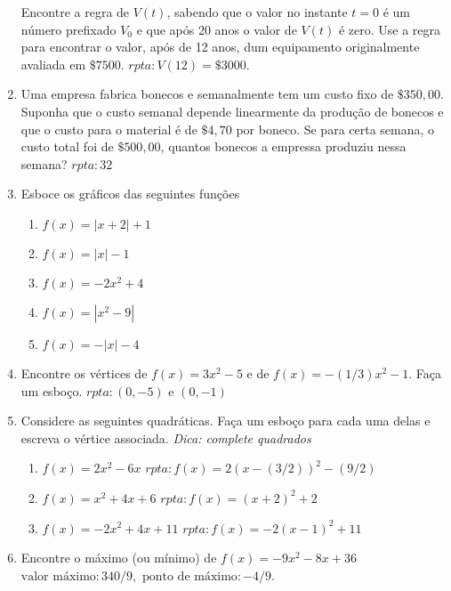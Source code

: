 \documentclass[11pt]{article}
\begin{document}
\begin{enumerate}
      Encontre a regra de $V(t)$, sabendo que o valor no instante $t=0$ é um número prefixado $V_{0}$ e que após 20 anos o valor de $V(t)$ é zero. 
      Use a regra para encontrar o valor, após de 12 anos, dum equipamento originalmente avaliada em $\$ 7 500$.  
               \hfill $rpta: V(12)= \$ 3 000$.
     \item Uma empresa fabrica bonecos e semanalmente tem um custo fixo de $\$ 350, 00$. Suponha que o custo semanal depende linearmente da produção de bonecos e que o custo para o material é de $\$ 4,70$ por boneco. Se para certa semana, o custo total foi de $\$ 500,00$, quantos bonecos a empressa produziu nessa semana? 
       \hfill $rpta: 32$                                                                                 
     \item Esboce os gráficos das seguintes funções 
        \begin{enumerate}
        \item $f(x)=|x+2|+1$ 
        \item $f(x)=|x|-1$
        \item $f(x)=-2x^{2}+4$
        \item $f(x)=|x^{2}-9|$
        \item $f(x)=-|x|-4$
        \end{enumerate}     
     \item Encontre os vértices 
     de $f(x)=3x^{2}-5$ e de $f(x)=-(1/3)x^{2}-1$.
     Faça um esboço. $rpta: (0,-5) \text{ e } (0,-1)$  
     \item Considere as seguintes quadráticas. Faça um esboço para cada uma delas e escreva o vértice associada. {\it Dica: complete quadrados}
       \begin{enumerate}
       \item $f(x)=2x^{2}-6x$    
              \hfill $rpta: f(x)=2(x-(3/2))^{2}-(9/2)$                             
       \item $f(x)=x^{2}+4x+6$   
              \hfill $rpta: f(x)=(x+2)^{2}+2$
       \item $f(x)=-2x^{2}+4x+11$   
              \hfill $rpta: f(x)=-2(x-1)^{2}+11$                                                                 
       \end{enumerate}    
     \item Encontre o máximo (ou mínimo) de 
     $f(x)=-9x^{2}-8x+36$  
             \hfill $\text{valor  máximo}: 340/9, 
             \text{ ponto de máximo}: -4/9$.                                                                            

\end{enumerate}
\end{document}

